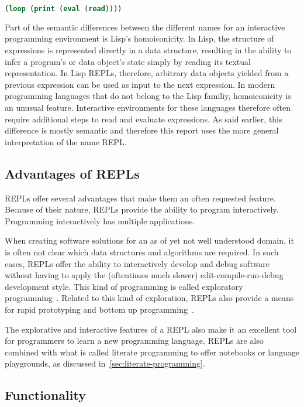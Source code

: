 \begin{lstlisting}[language=lisp]
(loop (print (eval (read))))
\end{lstlisting}

Part of the semantic differences between the different names for an interactive
programming environment is Lisp's homoiconicity. In Lisp, the structure of
expressions is represented directly in a data structure, resulting in the
ability to infer a program's or data object's state simply by reading its
textual representation. In Lisp REPLs, therefore, arbitrary data objects yielded
from a previous expression can be used as input to the next expression. In
modern programming languages that do not belong to the Lisp familiy,
homoiconicity is an unusual feature. Interactive environments for these
languages therefore often require additional steps to read and evaluate
expressions. As said earlier, this difference is mostly semantic and therefore
this report uses the more general interpretation of the name REPL.

\subsection{Advantages of REPLs}
\label{ssec:repl-advantages}
REPLs offer several advantages that make them an often requested feature.
Because of their nature, REPLs provide the ability to program interactively.
Programming interactively has multiple applications.

When creating software solutions for an as of yet not well understood domain,
it is often not clear which data structures and algorithms are required. In such
cases, REPLs offer the ability to interactively develop and debug software
without having to apply the (oftentimes much slower) edit-compile-run-debug
development style. This kind of programming is called exploratory
programming~\cite{Fritzson86}. Related to this kind of exploration, REPLs also
provide a means for rapid prototyping and bottom up programming~\cite{Graham93}.

The explorative and interactive features of a REPL also make it an excellent
tool for programmers to learn a new programming language. REPLs are also
combined with what is called literate programming to offer notebooks or language
playgrounds, as discussed in~\cref{sec:literate-programming}.

\subsection{Functionality}
\label{sssec:repl-functionality}

